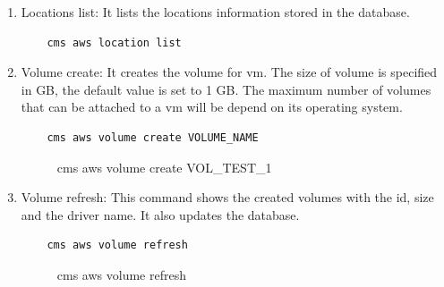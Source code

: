 \documentclass[9pt,twocolumn,twoside]{../../styles/osajnl}
\begin{document}
\begin{enumerate}
	\item Locations list: It lists the locations information stored in the database.
	
	\begin{verbatim}
	cms aws location list
	\end{verbatim}
	
    \item Volume create: It creates the volume for vm. The size of volume is specified in GB, the default value is set to 1 GB. The maximum number of volumes that can be attached to a vm will be depend on its operating system.
    
    \begin{verbatim}
    cms aws volume create VOLUME_NAME
    \end{verbatim}
    
    \begin{figure}[h!]
    	\centering
    	\caption{cms aws volume create VOL\_TEST\_1}
    	\label{fig:createvolume}
    \end{figure}
     
    \item Volume refresh: This command shows the created volumes with the id, size and the driver name. It also updates the database.
    
    \begin{verbatim}
    cms aws volume refresh
    \end{verbatim}
    
    \begin{figure}[h!]
    	\centering
    	\caption{cms aws volume refresh}
    	\label{fig:volumelist}
    \end{figure}
    

\end{enumerate}
\end{document}
